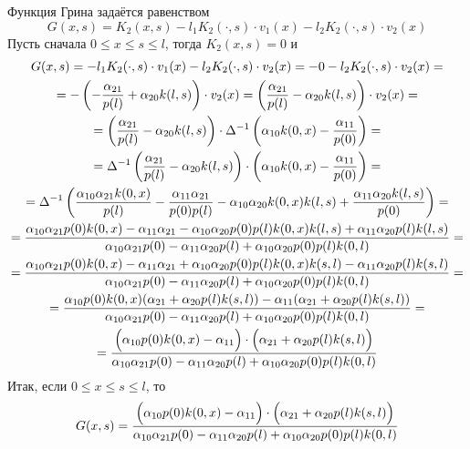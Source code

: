 \documentclass[a4paper,12pt]{article} %
\begin{document}
Функция Грина задаётся равенством
\begin{equation}
	G(x,s) = K_2(x,s) - l_1 K_2(\cdot, s) \cdot v_1(x) - l_2 K_2(\cdot, s) \cdot v_2(x)
\end{equation}
Пусть сначала $0 \leq x\leq s \leq l$, тогда $K_2(x,s) = 0$ и
\begin{multline}
	G(x,s)
	=
	- l_1 K_2(\cdot, s) \cdot v_1(x) - l_2 K_2(\cdot, s) \cdot v_2(x)
	=
	- 0 - l_2 K_2(\cdot, s) \cdot v_2(x)
	=
	\\=
	- \left( -\frac{\alpha_{21}}{p(l)} + \alpha_{20} k(l,s) \right) \cdot v_2(x)
	=
	\left( \frac{\alpha_{21}}{p(l)} - \alpha_{20} k(l,s) \right) \cdot v_2(x)
	=
	\\=
	\left( \frac{\alpha_{21}}{p(l)} - \alpha_{20} k(l,s) \right) \cdot
	\Delta^{-1}
	\left(
		\alpha_{10} k(0, x) - \frac{\alpha_{11}}{p(0)}
	\right)
	=
	\\=
	\Delta^{-1}
	\left(
		\frac{\alpha_{21}}{p(l)} - \alpha_{20} k(l,s)
	\right) \cdot \left(
		\alpha_{10} k(0, x) - \frac{\alpha_{11}}{p(0)}
	\right)
	=
	\\=
	\Delta^{-1}
	\left(
		 \frac{\alpha_{10}\alpha_{21} k(0, x)}{p(l)}
		-\frac{\alpha_{11}\alpha_{21}}{p(0)p(l)}
		-\alpha_{10} \alpha_{20} k(0, x) k(l,s)
		+\frac{\alpha_{11}\alpha_{20} k(l,s)}{p(0)}
	\right)
	=
	\\=
	\frac{
		  \alpha_{10} \alpha_{21} p(0) k(0, x)
		- \alpha_{11} \alpha_{21}
		- \alpha_{10} \alpha_{20} p(0) p(l) k(0, x) k(l, s)
		+ \alpha_{11} \alpha_{20} p(l) k(l,s)
	}{
		\alpha_{10}\alpha_{21}p(0)  - \alpha_{11}\alpha_{20}p(l) + \alpha_{10}\alpha_{20} p(0) p(l) k(0,l)
	}
	=
	\\=
	\frac{
		  \alpha_{10} \alpha_{21} p(0) k(0, x)
		- \alpha_{11} \alpha_{21}
		+ \alpha_{10} \alpha_{20} p(0) p(l) k(0, x) k(s, l)
		- \alpha_{11} \alpha_{20} p(l) k(s,l)
	}{
		\alpha_{10}\alpha_{21}p(0)  - \alpha_{11}\alpha_{20}p(l) + \alpha_{10}\alpha_{20} p(0) p(l) k(0,l)
	}
	=
	\\=
	\frac{
		  \alpha_{10} p(0) k(0, x) (\alpha_{21} + \alpha_{20} p(l) k(s, l))
		- \alpha_{11} (\alpha_{21} + \alpha_{20} p(l) k(s,l))
	}{
		\alpha_{10}\alpha_{21}p(0)  - \alpha_{11}\alpha_{20}p(l) + \alpha_{10}\alpha_{20} p(0) p(l) k(0,l)
	}
	=
	\\=
	\frac{
		 \Bigl(\alpha_{10} p(0) k(0, x) - \alpha_{11}\Bigr) \cdot \Bigl(\alpha_{21} + \alpha_{20} p(l) k(s, l)\Bigr)
	}{
		\alpha_{10}\alpha_{21}p(0)  - \alpha_{11}\alpha_{20}p(l) + \alpha_{10}\alpha_{20} p(0) p(l) k(0,l)
	}
\end{multline}
Итак, если $0 \leq x\leq s \leq l$, то
\begin{equation}\label{Gxs_x_leq_s}
	G(x,s)
	=
	\frac{
		 \Bigl(\alpha_{10} p(0) k(0, x) - \alpha_{11}\Bigr) \cdot \Bigl(\alpha_{21} + \alpha_{20} p(l) k(s, l)\Bigr)
	}{
		\alpha_{10}\alpha_{21}p(0)  - \alpha_{11}\alpha_{20}p(l) + \alpha_{10}\alpha_{20} p(0) p(l) k(0,l)
	}
\end{equation}
\end{document}
